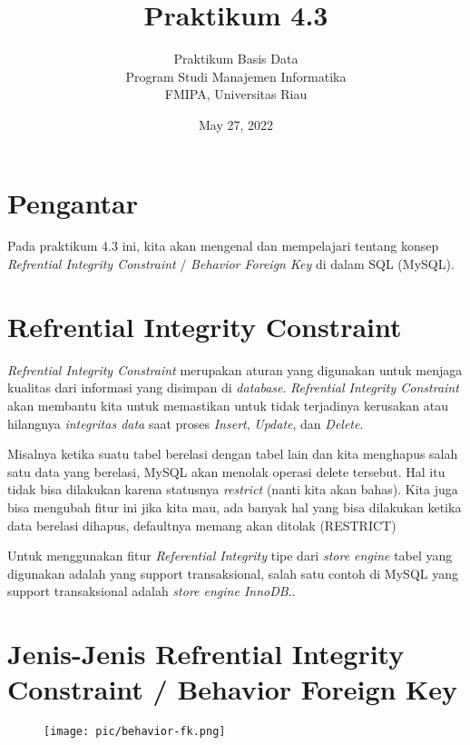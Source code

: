 \documentclass[a4paper]{article}
\title{Praktikum 4.3}
\author{Praktikum Basis Data\\ Program Studi Manajemen Informatika \\ FMIPA, Universitas Riau }
\date{May 27, 2022}
\begin{document}
\maketitle

\section{Pengantar}%
\label{sec:pengantar}

Pada praktikum 4.3 ini, kita akan mengenal dan mempelajari tentang konsep \textit{Refrential Integrity Constraint} /  \textit{Behavior Foreign Key} di dalam SQL (MySQL).

\section{Refrential Integrity Constraint}%
\label{sec:section_name}

\textit{Refrential Integrity Constraint} merupakan aturan yang digunakan untuk menjaga kualitas dari informasi yang disimpan di \textit{database}. \textit{Refrential  Integrity Constraint} akan membantu kita untuk memastikan untuk tidak terjadinya kerusakan atau hilangnya \textit{integritas data} saat proses \textit{Insert}, \textit{Update}, dan \textit{Delete}.

Misalnya ketika suatu tabel berelasi dengan tabel lain dan kita menghapus salah satu data yang berelasi, MySQL akan menolak operasi delete tersebut. Hal itu tidak bisa dilakukan karena statusnya \textit{restrict} (nanti kita akan bahas).  Kita juga bisa mengubah fitur ini jika kita mau, ada banyak hal yang bisa dilakukan ketika data berelasi dihapus, defaultnya memang akan ditolak (RESTRICT)

Untuk menggunakan fitur \textit{Referential Integrity} tipe dari \textit{store engine} tabel yang digunakan adalah yang support transaksional, salah satu contoh di MySQL yang support transaksional adalah \textit{store engine InnoDB}..

\section{Jenis-Jenis Refrential Integrity Constraint / Behavior Foreign Key}%
\label{sec:section_name}
\begin{figure}[htpb]
	\centering
	\texttt{[image: pic/behavior-fk.png]}
\end{figure}
\end{document}
